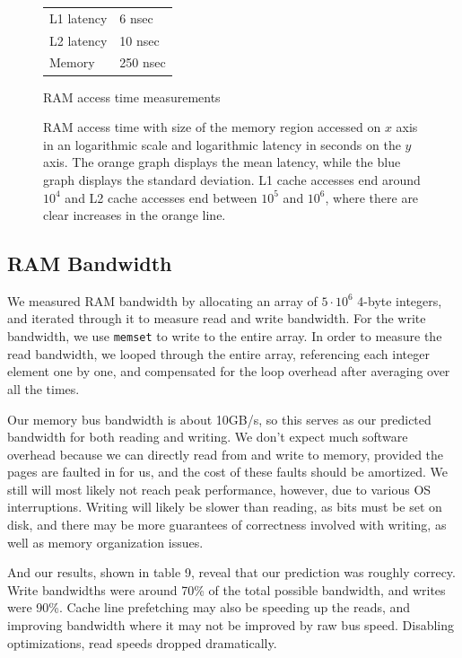 \documentclass[letterpaper,twocolumn,10pt]{article}
\begin{document}
\begin{figure}
	\centering

	\begin{tabular}{ll}
		L1 latency  & 6 nsec  \\
		L2 latency  & 10 nsec  \\
		Memory   & 250 nsec   \\
	\end{tabular}
	\caption{RAM access time measurements}
	\label{tab:accesstime}
\end{figure}

\begin{figure}
	\centering
	
    \caption{RAM access time with size of the memory region accessed on $x$  axis in an logarithmic scale and logarithmic latency in seconds on the $y$ axis. The orange graph displays the mean latency, while the blue graph displays the standard deviation. L1 cache accesses end around $10^{4}$ and L2 cache accesses end between $10^{5}$ and $10^{6}$, where there are clear increases in the orange line.}
	\label{fig:memlatency}
\end{figure}

\subsection{RAM Bandwidth}
We measured RAM bandwidth by allocating an array of $5 \cdot 10^6$ 4-byte
integers, and iterated through it to measure read and write bandwidth. For the
write bandwidth, we use \texttt{memset} to write to the entire array. In order
to measure the read bandwidth, we looped through the entire array, referencing
each integer element one by one, and compensated for the loop overhead after
averaging over all the times.

Our memory bus bandwidth is about 10GB/s, so this serves as our predicted
bandwidth for both reading and writing. We don't expect much software
overhead because we can directly read from and write to memory, provided the
pages are faulted in for us, and the cost of these faults should be amortized.
We still will most likely not reach peak performance, however, due to various
OS interruptions. Writing will likely be slower than reading, as bits must be set
on disk, and there may be more guarantees of correctness involved with writing, as 
well as memory organization issues.

And our results, shown in table 9, reveal that our prediction was roughly correcy. Write 
bandwidths were around 70\% of the total possible bandwidth, and writes were 90\%. Cache line
prefetching may also be speeding up the reads, and improving bandwidth where it may not 
be improved by raw bus speed. Disabling optimizations, read speeds dropped dramatically.
\end{document}
